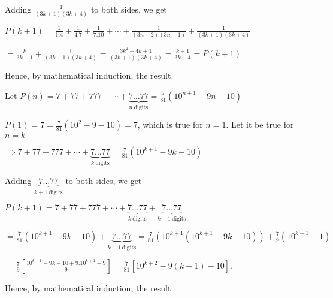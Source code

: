   Adding $\frac{1}{(3k + 1)(3k + 4)}$ to both sides, we get

  $P(k + 1) = \frac{1}{1.4} + \frac{1}{4.7} + \frac{1}{7.10} + \cdots + \frac{1}{(3n - 2)(3n + 1)} +
  \frac{1}{(3k + 1)(3k + 4)}$

  $= \frac{k}{3k + 1} + \frac{1}{(3k + 1)(3k + 4)} = \frac{3k^2 + 4k + 1}{(3k + 1)(3k + 4)} =\frac{k + 1}{3k
    + 4} = P(k + 1)$

  Hence, by mathematical induction, the result.
\item Let $P(n) = 7 + 77 + 777 + \cdots + \underbrace{7\ldots77}_{n~\text{digits}} = \frac{7}{81}(10^{n + 1} - 9n -
  10)$

  $P(1) = 7 = \frac{7}{81}(10^2 - 9 - 10) = 7$, which is true for $n = 1$. Let it be true for $n = k$

  $\Rightarrow 7 + 77 + 777 + \cdots + \underbrace{7\ldots77}_{k~\text{digits}} = \frac{7}{81}(10^{k + 1} - 9k -
  10)$

  Adding $\underbrace{7\ldots77}_{k + 1~\text{digits}}$ to both sides, we get

  $P(k + 1) = 7 + 77 + 777 + \cdots + \underbrace{7\ldots77}_{k~\text{digits}} + \underbrace{7\ldots77}_{k +
    1~\text{digits}}$

  $= \frac{7}{81}(10^{k + 1} - 9k - 10) + \underbrace{7\ldots77}_{k + 1~\text{digits}} = \frac{7}{81}(10^{k
    + 1}(10^{k + 1} - 9k - 10)) + \frac{7}{9}(10^{k + 1} - 1)$

  $= \frac{7}{9}\left[\frac{10^{k + 1} - 9k - 10 + 9.10^{k + 1} - 9}{9}\right] = \frac{7}{81}[10^{k + 2} -
    9(k + 1) - 10]$.

  Hence, by mathematical induction, the result.
\stopitemize